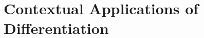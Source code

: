 \documentclass[../abcalc.tex]{subfiles}
\begin{document}
\chapter{Contextual Applications of Differentiation}
\end{document}
